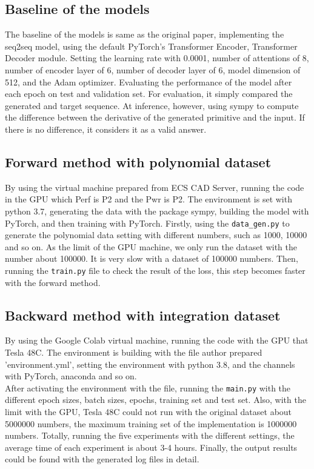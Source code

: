 \documentclass{article} %
\begin{document}
\subsection{Baseline of the models}
The baseline of the models is same as the original paper, implementing the seq2seq model, using the default PyTorch's Transformer Encoder, Transformer Decoder module. Setting the learning rate with 0.0001, number of attentions of 8, number of encoder layer of 6, number of decoder layer of 6, model dimension of 512, and the Adam optimizer. Evaluating the performance of the model after each epoch on test and validation set. For evaluation, it simply compared the generated and target sequence. At inference, however, using sympy to compute the difference between the derivative of the generated primitive and the input. If there is no difference, it considers it as a valid answer.

\subsection{Forward method with polynomial dataset}
\label{implement_fwd}
By using the virtual machine prepared from ECS CAD Server, running the code in the GPU which Perf is P2 and the Pwr is P2. The environment is set with python 3.7, generating the data with the package sympy, building the model with PyTorch, and then training with PyTorch. Firstly, using the \texttt{data\_gen.py} to generate the polynomial data setting with different numbers, such as 1000, 10000 and so on. As the limit of the GPU machine, we only run the dataset with the number about 100000. It is very slow with a dataset of 100000 numbers. Then, running the \texttt{train.py} file to check the result of the loss, this step becomes faster with the forward method.

\subsection{Backward method with integration dataset}
By using the Google Colab virtual machine, running the code with the GPU that Tesla 48C. The environment is building with the file author prepared 'environment.yml', setting the environment with python 3.8, and the channels with PyTorch, anaconda and so on.\\
After activating the environment with the file, running the \texttt{main.py} with the different epoch sizes, batch sizes, epochs, training set and test set. Also, with the limit with the GPU, Tesla 48C could not run with the original dataset about 5000000 numbers, the maximum training set of the implementation is 1000000 numbers. Totally, running the five experiments with the different settings, the average time of each experiment is about 3-4 hours. Finally, the output results could be found with the generated log files in detail.
\end{document}
